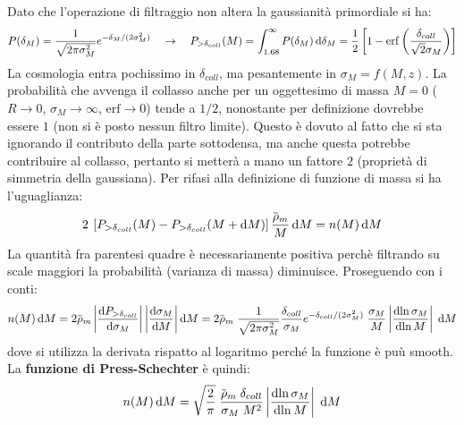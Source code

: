 Dato che l'operazione di filtraggio non altera la gaussianità primordiale si ha:
\begin{equation*}
    P(\delta_M)=\frac{1}{\sqrt{2\pi \sigma_M^2}}e^{-\delta_M / (2\sigma_M^2)}\quad \to \quad P_{>\delta_{coll}}(M)=\int_{1.68}^\infty P(\delta_M)\operatorname{d}\!{\delta_M}= \frac{1}{2}\left[1-\mathrm{erf}\left(\frac{\delta_{coll}}{\sqrt{2}\sigma_M}\right)\right]
\end{equation*}
La cosmologia entra pochissimo in $\delta_{coll}$, ma pesantemente in $\sigma_M=f(M,z)$. La probabilità che avvenga il collasso anche per un oggettesimo di massa $M= 0$ ($R\to 0$, $\sigma_M \to \infty$, $\mathrm{erf}\to 0$) tende a $1/2$, nonostante per definizione dovrebbe essere $1$ (non si è posto nessun filtro limite). Questo è dovuto al fatto che si sta ignorando il contributo della parte sottodensa, ma anche questa potrebbe contribuire al collasso, pertanto si metterà a mano un fattore $2$ (proprietà di simmetria della gaussiana). Per rifasi alla definizione di funzione di massa si ha l'uguaglianza:
\begin{equation*}
    2\: \left[P_{>\delta_{coll}}(M)-P_{>\delta_{coll}}(M+\d{M})\right]\frac{\overbar{\rho}_m }{M}\d{M}=n(M)\d{M}
\end{equation*}
La quantità fra parentesi quadre è necessariamente positiva perchè filtrando su scale maggiori la probabilità (varianza di massa) diminuisce. Proseguendo con i conti:
\begin{equation*}
    n(M)\d{M}= 2 \overbar{\rho}_m \left\lvert \frac{\d{P_{>\delta_{coll}}}}{\d{\sigma_M}}\right\rvert \left\lvert \frac{\d{\sigma_M}}{\d{M}}\right\rvert \d{M}=2 \overbar{\rho}_m\; \frac{1}{\sqrt{2\pi \sigma_M^2}}\frac{\delta_{coll}}{\sigma_M}e^{-\delta_{coll}/(2\sigma_M^2)}\; \frac{\sigma_M}{M} \left\lvert \frac{\d{\ln \sigma_M}}{\d{\ln M}}\right\rvert \; \d{M}
\end{equation*}
dove si utilizza la derivata rispatto al logaritmo perché la funzione è puù smooth. La \textbf{funzione di Press-Schechter} è quindi:
\begin{equation}
    n(M)\d{M}= \sqrt{\frac{2}{\pi}}  \;\frac{\overbar{\rho}_m\; \delta_{coll}}{\sigma_M\; M^2}\left\lvert \frac{\d{\ln \sigma_M}}{\d{\ln M}}\right\rvert \; \d{M}
\end{equation}

